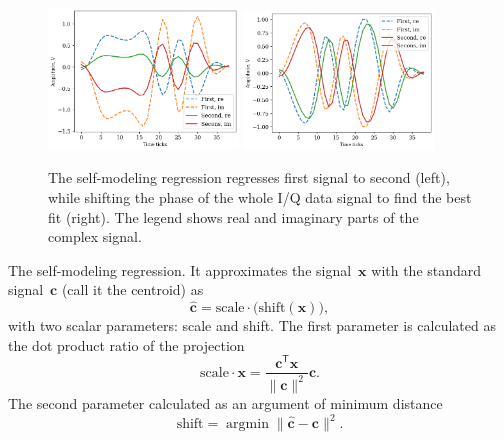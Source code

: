 \documentclass[12pt]{article}
\newcommand{\bw}{\mathbf{w}}
\newcommand{\T}{^\mathsf{T}}
\newcommand{\bphi}{\boldsymbol{\varphi}}
\newcommand{\bx}{\mathbf{x}}
\newcommand{\bc}{\mathbf{c}}
\newcommand{\bd}{\mathbf{d}}
\begin{document}
\begin{figure}[!tp]
\centering
\includegraphics[width=0.45\textwidth]{fig_amplitude_scaled_distance}
\includegraphics[width=0.45\textwidth]{fig_centroid_still_in_cluster}
\caption{The self-modeling regression regresses first signal to second (left), while shifting the phase of the whole I/Q data signal to find the best fit (right). The legend shows real and imaginary parts of the complex signal.}
\label{fig:projected_shift}
\end{figure}

The self-modeling regression. It approximates the signal~$\bx$ with the standard signal~$\bc$ (call it the centroid) as
\[
\hat{\bc} = \text{scale} \cdot \bigl( \text{shift}(\bx)\bigr),
\]  
with two scalar parameters: scale and shift. The first parameter is calculated as the dot product ratio of the projection 
\[
\text{scale}\cdot \bx = \frac{\bc\T\bx}{\|\bc\|^2}\bc.
\]
The second parameter calculated as an argument of minimum distance
\[
\text{shift} =\mathop{\arg\min}\|\hat{\bc}-\bc\|^2.
\]

\end{document}
